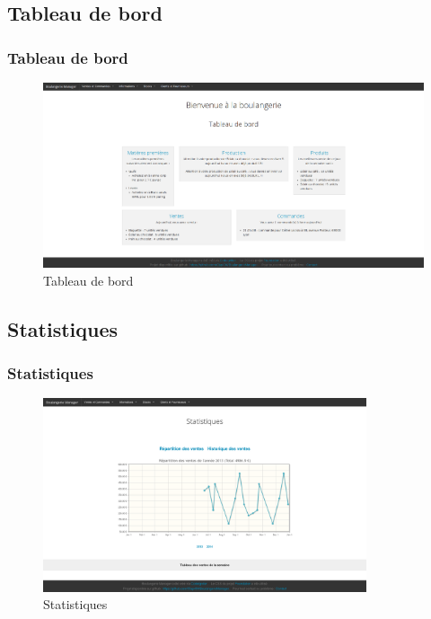 \subsection{Tableau de bord}
\begin{frame}
\frametitle{Tableau de bord}
\begin{figure}[h!]
    \centerline{\includegraphics[width=1\textwidth]{images/tableau_de_bord.png}}
    \caption{Tableau de bord}
\end{figure}
\end{frame}

\subsection{Statistiques}
\begin{frame}
\frametitle{Statistiques}
\begin{figure}[h!]
    \centerline{\includegraphics[width=0.85\textwidth]{images/stats.png}}
    \caption{Statistiques}
\end{figure}
\end{frame}


